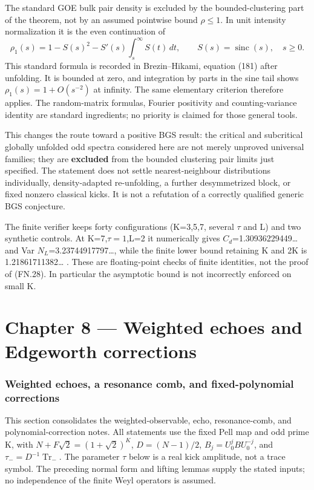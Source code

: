 The standard GOE bulk pair density is excluded by the bounded-clustering part of the theorem, not by an assumed pointwise bound \(\rho\leq1\). In unit intensity normalization it is the even continuation of \[
 \rho_1(s)=1-S(s)^2-S'(s)\int_s^\infty S(t)\,dt,\qquad
 S(s)=\operatorname{sinc}(s),\quad s\geq0.                       \tag{FN.32}
\] This standard formula is recorded in Brezin--Hikami, equation (181) after unfolding. It is bounded at zero, and integration by parts in the sine tail shows \(\rho_1(s)=1+O(s^{-2})\) at infinity. The same elementary criterion therefore applies. The random-matrix formulas, Fourier positivity and counting-variance identity are standard ingredients; no priority is claimed for those general tools.

This changes the route toward a positive BGS result: the critical and subcritical globally unfolded odd spectra considered here are not merely unproved universal families; they are \textbf{excluded} from the bounded clustering pair limits just specified. The statement does not settle nearest-neighbour distributions individually, density-adapted re-unfolding, a further desymmetrized block, or fixed nonzero classical kicks. It is not a refutation of a correctly qualified generic BGS conjecture.

The finite verifier keeps forty configurations (K=3,5,7, several \(\tau\) and L) and two synthetic controls. At K=7,\(\tau=1\),L=2 it numerically gives \(C_{d}\)=1.30936229449\ldots{} and Var \(N_{L}\)=3.23744917797\ldots, while the finite lower bound retaining K and 2K is 1.21861711382\ldots{} . These are floating-point checks of finite identities, not the proof of (FN.28). In particular the asymptotic bound is not incorrectly enforced on small K.

\part*{Chapter 8 --- Weighted echoes and Edgeworth corrections}

\section{Weighted echoes, a resonance comb, and fixed-polynomial corrections}
\label{sec:weighted}
This section consolidates the weighted-observable, echo, resonance-comb,
and polynomial-correction notes. All statements use the fixed Pell map and
odd prime K, with $N+F\sqrt2=(1+\sqrt2)^K$, $D=(N-1)/2$,
$B_j=U_0^jBU_0^{-j}$, and $\tau_-=D^{-1}\operatorname{Tr}_-$.
The parameter $\tau$ below is a real kick amplitude, not a trace symbol.
The preceding normal form and lifting lemmas supply the stated inputs;
no independence of the finite Weyl operators is assumed.

